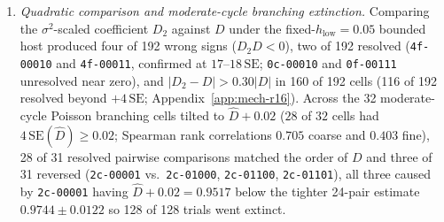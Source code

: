 \begin{enumerate}
\item \emph{Quadratic comparison and moderate-cycle branching extinction.} Comparing the $\sigma^2$-scaled coefficient $D_2$ against $D$ under the fixed-$h_{\mathrm{low}} = 0.05$ bounded host produced four of 192 wrong signs ($D_2 D < 0$), two of 192 resolved (\texttt{4f-00010} and \texttt{4f-00011}, confirmed at $17$--$18\,\mathrm{SE}$; \texttt{0c-00010} and \texttt{0f-00111} unresolved near zero), and $|D_2 - D| > 0.30|D|$ in 160 of 192 cells (116 of 192 resolved beyond $+4\,\mathrm{SE}$; Appendix~\ref{app:mech-r16}). Across the 32 moderate-cycle Poisson branching cells tilted to $\widehat{D} + 0.02$ ($28$ of $32$ cells had $4\,\mathrm{SE}(\widehat{D}) \ge 0.02$; Spearman rank correlations $0.705$ coarse and $0.403$ fine), 28 of 31 resolved pairwise comparisons matched the order of $D$ and three of 31 reversed (\texttt{2c-00001} vs.\ \texttt{2c-01000}, \texttt{2c-01100}, \texttt{2c-01101}), all three caused by \texttt{2c-00001} having $\widehat{D} + 0.02 = 0.9517$ below the tighter 24-pair estimate $0.9744 \pm 0.0122$ so 128 of 128 trials went extinct.
\end{enumerate}

